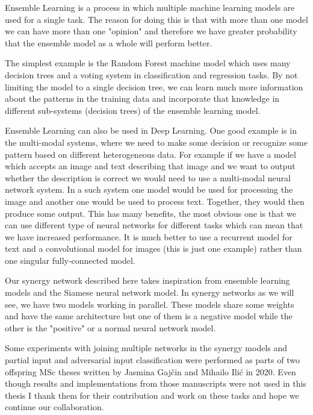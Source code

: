 \documentclass[b5paper]{book}
\let\cite\parencite
\begin{document}
Ensemble Learning is a process in which multiple machine learning models are used for a single task. The reason for doing this is that with more than one model we can have more than one "opinion" and therefore we have greater probability that the ensemble model as a whole will perform better.

The simplest example is the Random Forest machine model which uses many decision trees and a voting system in classification and regression tasks. By not limiting the model to a single decision tree, we can learn much more information about the patterns in the training data and incorporate that knowledge in different sub-systems (decision trees) \cite{russell2002artificial} of the ensemble learning model.

Ensemble Learning can also be used in Deep Learning. One good example is in the multi-modal systems, where we need to make some decision or recognize some pattern based on different heterogeneous data. For example if we have a model which accepts an image and text describing that image and we want to output whether the description is correct we would need to use a multi-modal neural network system. In a such system one model would be used for processing the image and another one would be used to process text. Together, they would then produce some output. This has many benefits, the most obvious one is that we can use different type of neural networks for different tasks which can mean that we have increased performance. It is much better to use a recurrent model for text and a convolutional model for images (this is just one example) rather than one singular fully-connected model.

Our synergy network \cite{milosevic2020synergy} described here takes inspiration from ensemble learning models and the Siamese neural network model. In synergy networks as we will see, we have two models working in parallel. These models share some weights and have the same architecture but one of them is a negative model while the other is the "positive" or a normal neural network model.

Some experiments with joining multiple networks in the synergy models \cite{jasmina} and partial input and adversarial input classification \cite{mihailo} were performed as parts of two offspring MSc theses written by Jasmina Gajčin and Mihailo Ilić in 2020. Even though results and implementations from those manuscripts were not used in this thesis I thank them for their contribution and work on these tasks and hope we continue our collaboration.
\end{document}
